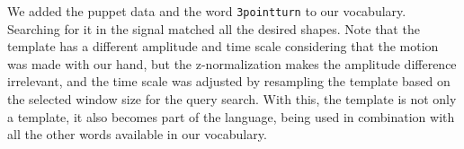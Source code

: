 We added the puppet data and the word \texttt{3pointturn} to our vocabulary. Searching for it in the signal matched all the desired shapes. Note that the template has a different amplitude and time scale considering that the motion was made with our hand, but the z-normalization makes the amplitude difference irrelevant, and the time scale was adjusted by resampling the template based on the selected window size for the query search. With this, the template is not only a template, it also becomes part of the language, being used in combination with all the other words available in our vocabulary.



%
%
%
%
%
%
%
